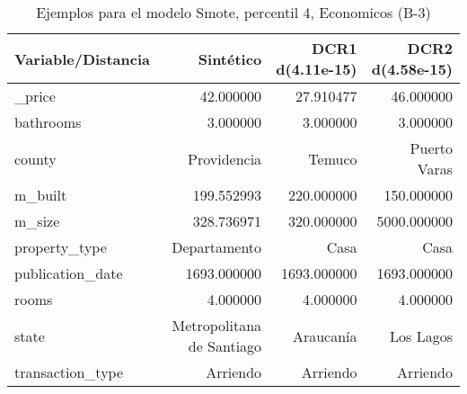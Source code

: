 \begin{table}[H]
\centering
\fontsize{10}{14}\selectfont
\caption{Ejemplos para el modelo Smote, percentil 4, Economicos (B-3)}
\label{table-example-economicos-b-3-smote-enc-4p}
\begin{tabular}{|l|r|r|r|}
\hline
\rowcolor[gray]{0.8}
Variable/Distancia & Sintético & DCR1 d(4.11e-15) & DCR2 d(4.58e-15) \\
\hline \_price & \cellcolor[rgb]{0.9, 0.54, 0.52} 42.000000 & 27.910477 & 46.000000 \\
\hline bathrooms & \cellcolor[rgb]{0.9, 0.54, 0.52} 3.000000 & \cellcolor[rgb]{0.9, 0.54, 0.52} 3.000000 & \cellcolor[rgb]{0.9, 0.54, 0.52} 3.000000 \\
\hline county & \cellcolor[rgb]{0.9, 0.54, 0.52} Providencia & Temuco & Puerto Varas \\
\hline m\_built & \cellcolor[rgb]{0.9, 0.54, 0.52} 199.552993 & 220.000000 & 150.000000 \\
\hline m\_size & \cellcolor[rgb]{0.9, 0.54, 0.52} 328.736971 & 320.000000 & 5000.000000 \\
\hline property\_type & \cellcolor[rgb]{0.9, 0.54, 0.52} Departamento & Casa & Casa \\
\hline publication\_date & \cellcolor[rgb]{0.9, 0.54, 0.52} 1693.000000 & \cellcolor[rgb]{0.9, 0.54, 0.52} 1693.000000 & \cellcolor[rgb]{0.9, 0.54, 0.52} 1693.000000 \\
\hline rooms & \cellcolor[rgb]{0.9, 0.54, 0.52} 4.000000 & \cellcolor[rgb]{0.9, 0.54, 0.52} 4.000000 & \cellcolor[rgb]{0.9, 0.54, 0.52} 4.000000 \\
\hline state & \cellcolor[rgb]{0.9, 0.54, 0.52} Metropolitana de Santiago & Araucanía & Los Lagos \\
\hline transaction\_type & \cellcolor[rgb]{0.9, 0.54, 0.52} Arriendo & \cellcolor[rgb]{0.9, 0.54, 0.52} Arriendo & \cellcolor[rgb]{0.9, 0.54, 0.52} Arriendo \\
\hline
\end{tabular}
\end{table}
